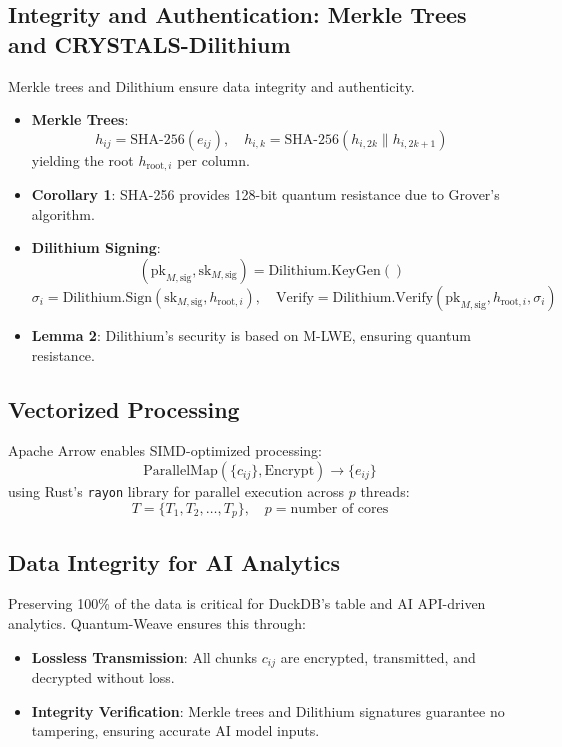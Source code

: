 \documentclass[12pt]{article}
\begin{document}
\subsection{Integrity and Authentication: Merkle Trees and CRYSTALS-Dilithium}
Merkle trees and Dilithium ensure data integrity and authenticity.
\begin{itemize}
    \item \textbf{Merkle Trees}:
    \[
    h_{ij} = \text{SHA-256}(e_{ij}), \quad h_{i,k} = \text{SHA-256}(h_{i,2k} \| h_{i,2k+1})
    \]
    yielding the root \( h_{\text{root},i} \) per column.
    \item \textbf{Corollary 1}: SHA-256 provides 128-bit quantum resistance due to Grover’s algorithm.
    \item \textbf{Dilithium Signing}:
    \[
    (\text{pk}_{M,\text{sig}}, \text{sk}_{M,\text{sig}}) = \text{Dilithium.KeyGen}()
    \]
    \[
    \sigma_i = \text{Dilithium.Sign}(\text{sk}_{M,\text{sig}}, h_{\text{root},i}), \quad \text{Verify} = \text{Dilithium.Verify}(\text{pk}_{M,\text{sig}}, h_{\text{root},i}, \sigma_i)
    \]
    \item \textbf{Lemma 2}: Dilithium’s security is based on M-LWE, ensuring quantum resistance.
\end{itemize}

\subsection{Vectorized Processing}
Apache Arrow enables SIMD-optimized processing:
\[
\text{ParallelMap}(\{c_{ij}\}, \text{Encrypt}) \rightarrow \{e_{ij}\}
\]
using Rust’s \texttt{rayon} library for parallel execution across \( p \) threads:
\[
T = \{T_1, T_2, \dots, T_p\}, \quad p = \text{number of cores}
\]

\subsection{Data Integrity for AI Analytics}
Preserving 100\% of the data is critical for DuckDB’s table and AI API-driven analytics. Quantum-Weave ensures this through:
\begin{itemize}
    \item \textbf{Lossless Transmission}: All chunks \( c_{ij} \) are encrypted, transmitted, and decrypted without loss.
    \item \textbf{Integrity Verification}: Merkle trees and Dilithium signatures guarantee no tampering, ensuring accurate AI model inputs.
\end{itemize}
\end{document}

